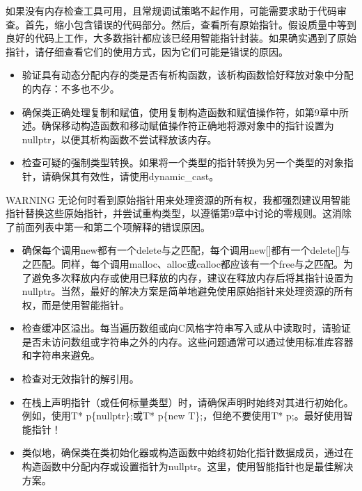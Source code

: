 如果没有内存检查工具可用，且常规调试策略不起作用，可能需要求助于代码审查。首先，缩小包含错误的代码部分。然后，查看所有原始指针。假设质量中等到良好的代码上工作，大多数指针都应该已经用智能指针封装。如果确实遇到了原始指针，请仔细查看它们的使用方式，因为它们可能是错误的原因。


\begin{itemize}
\item
验证具有动态分配内存的类是否有析构函数，该析构函数恰好释放对象中分配的内存：不多也不少。

\item
确保类正确处理复制和赋值，使用复制构造函数和赋值操作符，如第9章中所述。确保移动构造函数和移动赋值操作符正确地将源对象中的指针设置为nullptr，以便其析构函数不尝试释放该内存。

\item
检查可疑的强制类型转换。如果将一个类型的指针转换为另一个类型的对象指针，请确保其有效性，请使用dynamic\_cast。
\end{itemize}

\begin{myWarning}{WARNING}
无论何时看到原始指针用来处理资源的所有权，我都强烈建议用智能指针替换这些原始指针，并尝试重构类型，以遵循第9章中讨论的零规则。这消除了前面列表中第一和第二个项解释的错误原因。
\end{myWarning}


\begin{itemize}
\item
确保每个调用new都有一个delete与之匹配，每个调用new[]都有一个delete[]与之匹配。同样，每个调用malloc、alloc或calloc都应该有一个free与之匹配。为了避免多次释放内存或使用已释放的内存，建议在释放内存后将其指针设置为nullptr。当然，最好的解决方案是简单地避免使用原始指针来处理资源的所有权，而是使用智能指针。

\item
检查缓冲区溢出。每当遍历数组或向C风格字符串写入或从中读取时，请验证是否未访问数组或字符串之外的内存。这些问题通常可以通过使用标准库容器和字符串来避免。

\item
检查对无效指针的解引用。

\item
在栈上声明指针（或任何标量类型）时，请确保声明时始终对其进行初始化。例如，使用T* p\{nullptr\};或T* p\{new T\};，但绝不要使用T* p;。最好使用智能指针！

\item
类似地，确保类在类初始化器或构造函数中始终初始化指针数据成员，通过在构造函数中分配内存或设置指针为nullptr。这里，使用智能指针也是最佳解决方案。
\end{itemize}


